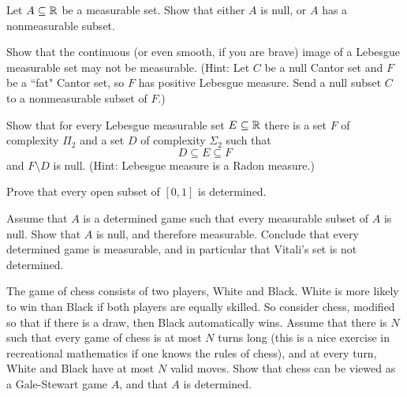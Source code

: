 \begin{exercise}
Let $A \subseteq \mathbb{R}$ be a measurable set.
Show that either $A$ is null, or $A$ has a nonmeasurable subset.
\end{exercise}

\begin{exercise}
Show that the continuous (or even smooth, if you are brave) image of a Lebesgue measurable set may not be measurable.
(Hint: Let $C$ be a null Cantor set and $F$ be a ``fat" Cantor set, so $F$ has positive Lebesgue measure.
Send a null subset $C$ to a nonmeasurable subset of $F$.)
\end{exercise}

\begin{exercise}
Show that for every Lebesgue measurable set $E \subseteq \mathbb{R}$ there is a set $F$ of complexity $\Pi_2$ and a set $D$ of complexity $\Sigma_2$ such that
$$D \subseteq E \subseteq F$$
and $F \setminus D$ is null. (Hint: Lebesgue measure is a Radon measure.)
\end{exercise}

\begin{exercise}
Prove that every open subset of $[0, 1]$ is determined.
\end{exercise}

\begin{exercise}\label{determined games are measurable}
Assume that $A$ is a determined game such that every measurable subset of $A$ is null.
Show that $A$ is null, and therefore measurable.
Conclude that every determined game is measurable, and in particular that Vitali's set is not determined.
\end{exercise}

\begin{exercise}[Zermelo]
The game of chess consists of two players, White and Black.
White is more likely to win than Black if both players are equally skilled.
So consider chess, modified so that if there is a draw, then Black automatically wins.
Assume that there is $N$ such that every game of chess is at most $N$ turns long (this is a nice exercise in recreational mathematics if one knows the rules of chess), and at every turn, White and Black have at most $N$ valid moves.
Show that chess can be viewed as a Gale-Stewart game $A$, and that $A$ is determined.
\end{exercise}
